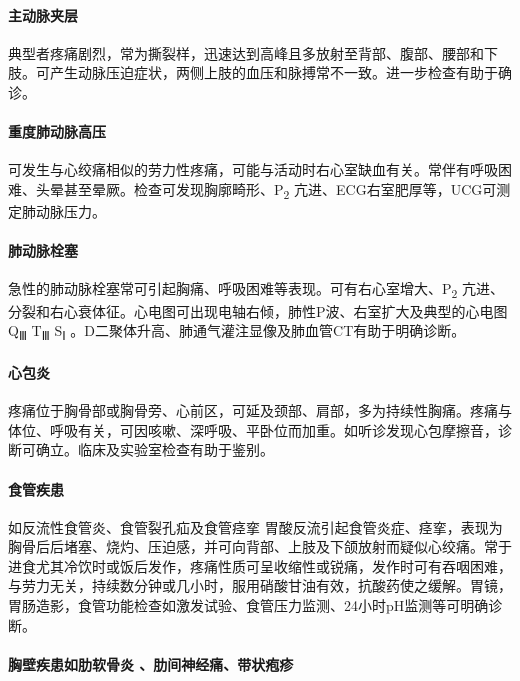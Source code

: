 \paragraph{主动脉夹层}

典型者疼痛剧烈，常为撕裂样，迅速达到高峰且多放射至背部、腹部、腰部和下肢。可产生动脉压迫症状，两侧上肢的血压和脉搏常不一致。进一步检查有助于确诊。

\paragraph{重度肺动脉高压}

可发生与心绞痛相似的劳力性疼痛，可能与活动时右心室缺血有关。常伴有呼吸困难、头晕甚至晕厥。检查可发现胸廓畸形、P\textsubscript{2}
亢进、ECG右室肥厚等，UCG可测定肺动脉压力。

\paragraph{肺动脉栓塞}

急性的肺动脉栓塞常可引起胸痛、呼吸困难等表现。可有右心室增大、P\textsubscript{2}
亢进、分裂和右心衰体征。心电图可出现电轴右倾，肺性P波、右室扩大及典型的心电图Q\textsubscript{Ⅲ}
T\textsubscript{Ⅲ} S\textsubscript{Ⅰ}
。D二聚体升高、肺通气灌注显像及肺血管CT有助于明确诊断。

\paragraph{心包炎}

疼痛位于胸骨部或胸骨旁、心前区，可延及颈部、肩部，多为持续性胸痛。疼痛与体位、呼吸有关，可因咳嗽、深呼吸、平卧位而加重。如听诊发现心包摩擦音，诊断可确立。临床及实验室检查有助于鉴别。

\paragraph{食管疾患}

如反流性食管炎、食管裂孔疝及食管痉挛
胃酸反流引起食管炎症、痉挛，表现为胸骨后后堵塞、烧灼、压迫感，并可向背部、上肢及下颌放射而疑似心绞痛。常于进食尤其冷饮时或饭后发作，疼痛性质可呈收缩性或锐痛，发作时可有吞咽困难，与劳力无关，持续数分钟或几小时，服用硝酸甘油有效，抗酸药使之缓解。胃镜，胃肠造影，食管功能检查如激发试验、食管压力监测、24小时pH监测等可明确诊断。

\paragraph{胸壁疾患如肋软骨炎 、肋间神经痛、带状疱疹}

